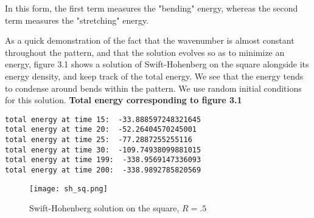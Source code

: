 \documentclass[12pt]{article}
\numberwithin{equation}{section}
\begin{document}
In this form, the first term measures the "bending" energy, whereas the second term measures the "stretching" energy.
\par As a quick demonstration of the fact that the wavenumber is almost constant throughout the pattern, and that the solution evolves so as to minimize an energy, figure 3.1 shows a solution of Swift-Hohenberg on the square alongside its energy density, and keep track of the total energy. We see that the energy tends to condense around bends within the pattern. We use random initial conditions for this solution.\newline
\textbf{Total energy corresponding to figure 3.1}
\begin{verbatim}
total energy at time 15:  -33.888597248321645
total energy at time 20:  -52.26404570245001
total energy at time 25:  -77.2887255255116
total energy at time 30:  -109.74938099881015
total energy at time 199:  -338.9569147336093
total energy at time 200:  -338.9892785820569
\end{verbatim}
\begin{figure}
\centering
\texttt{[image: sh\_sq.png]}
\caption{Swift-Hohenberg solution on the square, $R=.5$}
\end{figure}
\end{document}
